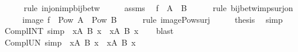 \begin{isabellebody}
\ \ \ \ \isamarkupfalse%
\ {\isacharparenleft}{\kern0pt}rule\ inj{\isacharunderscore}{\kern0pt}on{\isacharunderscore}{\kern0pt}imp{\isacharunderscore}{\kern0pt}bij{\isacharunderscore}{\kern0pt}betw{\isacharparenright}{\kern0pt}\isanewline
\ \ \isamarkupfalse%
\ \isamarkupfalse%
\ assms\ \isamarkupfalse%
\ {\isachardoublequoteopen}f\ {\isacharbackquote}{\kern0pt}\ A\ {\isacharequal}{\kern0pt}\ B{\isachardoublequoteclose}\isanewline
\ \ \ \ \isamarkupfalse%
\ {\isacharparenleft}{\kern0pt}rule\ bij{\isacharunderscore}{\kern0pt}betw{\isacharunderscore}{\kern0pt}imp{\isacharunderscore}{\kern0pt}surj{\isacharunderscore}{\kern0pt}on{\isacharparenright}{\kern0pt}\isanewline
\ \ \isamarkupfalse%
\ \isamarkupfalse%
\ {\isachardoublequoteopen}image\ f\ {\isacharbackquote}{\kern0pt}\ Pow\ A\ {\isacharequal}{\kern0pt}\ Pow\ B{\isachardoublequoteclose}\isanewline
\ \ \ \ \isamarkupfalse%
\ {\isacharparenleft}{\kern0pt}rule\ image{\isacharunderscore}{\kern0pt}Pow{\isacharunderscore}{\kern0pt}surj{\isacharparenright}{\kern0pt}\isanewline
\ \ \isamarkupfalse%
\ \isamarkupfalse%
\ {\isacharquery}{\kern0pt}thesis\ \isamarkupfalse%
\ simp\isanewline
{}\isamarkupfalse%
%
\endisatagproof
{\isafoldproof}%
%
\isadelimproof
%
\endisadelimproof
%
\isadelimdocument
%
\endisadelimdocument
%
\isatagdocument
%
\isamarkuptrue%
%
\endisatagdocument
{\isafolddocument}%
%
\isadelimdocument
%
\endisadelimdocument
{}\isamarkupfalse%
\ Compl{\isacharunderscore}{\kern0pt}INT\ {\isacharbrackleft}{\kern0pt}simp{\isacharbrackright}{\kern0pt}{\isacharcolon}{\kern0pt}\ {\isachardoublequoteopen}{\isacharminus}{\kern0pt}\ {\isacharparenleft}{\kern0pt}{\isasymInter}x{\isasymin}A{\isachardot}{\kern0pt}\ B\ x{\isacharparenright}{\kern0pt}\ {\isacharequal}{\kern0pt}\ {\isacharparenleft}{\kern0pt}{\isasymUnion}x{\isasymin}A{\isachardot}{\kern0pt}\ {\isacharminus}{\kern0pt}B\ x{\isacharparenright}{\kern0pt}{\isachardoublequoteclose}\isanewline
%
\isadelimproof
\ \ %
\endisadelimproof
%
\isatagproof
{}\isamarkupfalse%
\ blast%
\endisatagproof
{\isafoldproof}%
%
\isadelimproof
\isanewline
%
\endisadelimproof
\isanewline
{}\isamarkupfalse%
\ Compl{\isacharunderscore}{\kern0pt}UN\ {\isacharbrackleft}{\kern0pt}simp{\isacharbrackright}{\kern0pt}{\isacharcolon}{\kern0pt}\ {\isachardoublequoteopen}{\isacharminus}{\kern0pt}\ {\isacharparenleft}{\kern0pt}{\isasymUnion}x{\isasymin}A{\isachardot}{\kern0pt}\ B\ x{\isacharparenright}{\kern0pt}\ {\isacharequal}{\kern0pt}\ {\isacharparenleft}{\kern0pt}{\isasymInter}x{\isasymin}A{\isachardot}{\kern0pt}\ {\isacharminus}{\kern0pt}B\ x{\isacharparenright}{\kern0pt}{\isachardoublequoteclose}\isanewline

\end{isabellebody}
